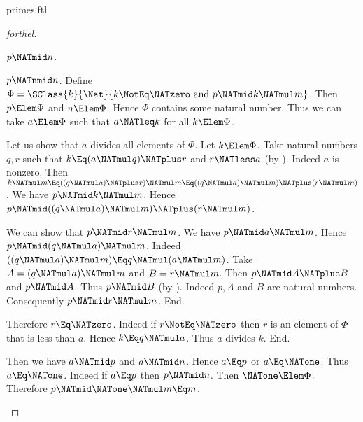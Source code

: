 \documentclass{stex}
\begin{document}
\begin{smodule}{primes.ftl}
\begin{proof}[forthel]
  \begin{case}{$p \NATmid n$.} \end{case}

  \begin{case}{$p \NATnmid n$.}
    Define $\Phi = \SClass{k}{\Nat}{k \NotEq \NATzero\text{ and }p \NATmid k \NATmul m}$.
    Then $p \Elem \Phi$ and $n \Elem \Phi$.
    Hence $\Phi$ contains some natural number.
    Thus we can take $a \Elem \Phi$ such that $a \NATleq k$ for all $k \Elem \Phi$.

    Let us show that $a$ divides all elements of $\Phi$.
      Let $k \Elem \Phi$.
      Take natural numbers $q, r$ such that $k \Eq (a \NATmul q) \NATplus r$ and $r \NATless a$ (by ).
      Indeed $a$ is nonzero.
      Then $k \NATmul m
        \Eq ((q \NATmul a) \NATplus r) \NATmul m
        \Eq ((q \NATmul a) \NATmul m) \NATplus (r \NATmul m)$.
      We have $p \NATmid k \NATmul m$.
      Hence $p \NATmid ((q \NATmul a) \NATmul m) \NATplus (r \NATmul m)$.

      We can show that $p \NATmid r \NATmul m$.
        We have $p \NATmid a \NATmul m$.
        Hence $p \NATmid (q \NATmul a) \NATmul m$.
        Indeed $((q \NATmul a) \NATmul m) \Eq q \NATmul (a \NATmul m)$. %
        Take $A = (q \NATmul a) \NATmul m$ and $B = r \NATmul m$. %
        Then $p \NATmid A \NATplus B$ and $p \NATmid A$.
        Thus $p \NATmid B$ (by ).
        Indeed $p, A$ and $B$ are natural numbers.
        Consequently $p \NATmid r \NATmul m$.
      End.

      Therefore $r \Eq \NATzero$.
      Indeed if $r \NotEq \NATzero$ then $r$ is an element of $\Phi$ that is less than $a$.
      Hence $k \Eq q \NATmul a$.
      Thus $a$ divides $k$.
    End.

    Then we have $a \NATmid p$ and $a \NATmid n$.
    Hence $a \Eq p$ or $a \Eq \NATone$.
    Thus $a \Eq \NATone$.
    Indeed if $a \Eq p$ then $p \NATmid n$.
    Then $\NATone \Elem \Phi$.
    Therefore $p \NATmid \NATone \NATmul m \Eq m$.
  \end{case}
\end{proof}
\end{smodule}
\end{document}
